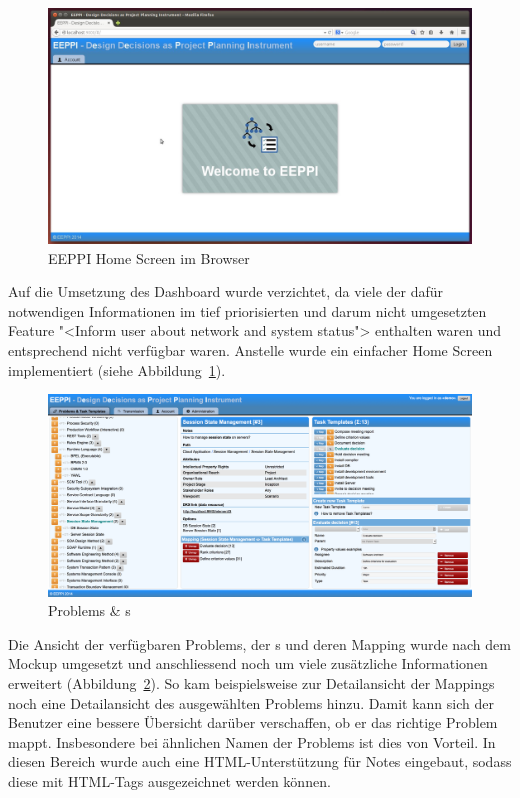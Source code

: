 		\begin{figure}[H]
			\centering
			\includegraphics[width=\linewidth]{tutorial/img/eeppiHomeScreen.jpg}
			\caption{EEPPI Home Screen im Browser}
			\label{fig:eeppiHomeScreen}
		\end{figure}	
		
		Auf die Umsetzung des Dashboard wurde verzichtet, da viele der dafür notwendigen Informationen im tief priorisierten und darum nicht umgesetzten Feature "<Inform user about network and system status"> enthalten waren und entsprechend nicht verfügbar waren.
		Anstelle wurde ein einfacher Home Screen implementiert (siehe Abbildung~\ref{fig:eeppiHomeScreen}).
		
		
		\begin{figure}[H]
			\centering
			\includegraphics[width=\linewidth]{tutorial/img/eeppiDecisionsAndTaskTemplates.png}
			\caption{Problems \& \ttpl s}
			\label{fig:eeppiDecisionsAndTaskTemplates}
		\end{figure}	
		
		Die Ansicht der verfügbaren Problems, der \ttpl s und deren Mapping wurde nach dem Mockup umgesetzt und anschliessend noch um viele zusätzliche Informationen erweitert (Abbildung~\ref{fig:eeppiDecisionsAndTaskTemplates}).
		So kam beispielsweise zur Detailansicht der Mappings noch eine Detailansicht des ausgewählten Problems hinzu.
		Damit kann sich der Benutzer eine bessere Übersicht darüber verschaffen,
		ob er das richtige Problem mappt.
		Insbesondere bei ähnlichen Namen der Problems ist dies von Vorteil.
		In diesen Bereich wurde auch eine HTML-Unterstützung für Notes eingebaut, 
		sodass diese mit HTML-Tags ausgezeichnet werden können.
		
